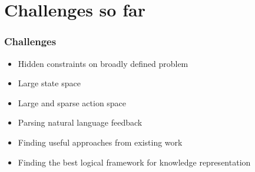\section{Challenges so far}




\begin{frame}

    \frametitle{Challenges}
    \begin{itemize}
        \item Hidden constraints on broadly defined problem
        \item Large state space
        \item Large and sparse action space
        \item Parsing natural language feedback
        \item Finding useful approaches from existing work
        \item Finding the best logical framework for knowledge
            representation
    \end{itemize}

\end{frame}

